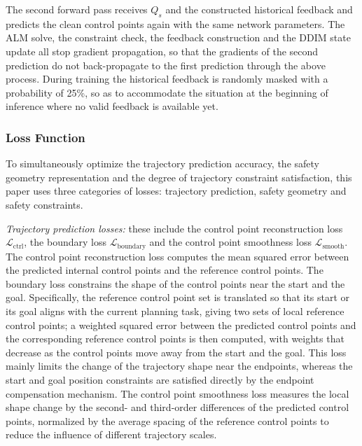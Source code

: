\documentclass[journal]{IEEEtran}
\begin{document}
The second forward pass receives $Q_s$ and the constructed historical feedback and predicts the clean control points again with the same network parameters. The ALM solve, the constraint check, the feedback construction and the DDIM state update all stop gradient propagation, so that the gradients of the second prediction do not back-propagate to the first prediction through the above process. During training the historical feedback is randomly masked with a probability of 25\%, so as to accommodate the situation at the beginning of inference where no valid feedback is available yet.

\subsubsection{Loss Function}

To simultaneously optimize the trajectory prediction accuracy, the safety geometry representation and the degree of trajectory constraint satisfaction, this paper uses three categories of losses: trajectory prediction, safety geometry and safety constraints.

\emph{Trajectory prediction losses:} these include the control point reconstruction loss $\mathcal L_{\mathrm{ctrl}}$, the boundary loss $\mathcal L_{\mathrm{boundary}}$ and the control point smoothness loss $\mathcal L_{\mathrm{smooth}}$. The control point reconstruction loss computes the mean squared error between the predicted internal control points and the reference control points. The boundary loss constrains the shape of the control points near the start and the goal. Specifically, the reference control point set is translated so that its start or its goal aligns with the current planning task, giving two sets of local reference control points; a weighted squared error between the predicted control points and the corresponding reference control points is then computed, with weights that decrease as the control points move away from the start and the goal. This loss mainly limits the change of the trajectory shape near the endpoints, whereas the start and goal position constraints are satisfied directly by the endpoint compensation mechanism. The control point smoothness loss measures the local shape change by the second- and third-order differences of the predicted control points, normalized by the average spacing of the reference control points to reduce the influence of different trajectory scales.
\end{document}
